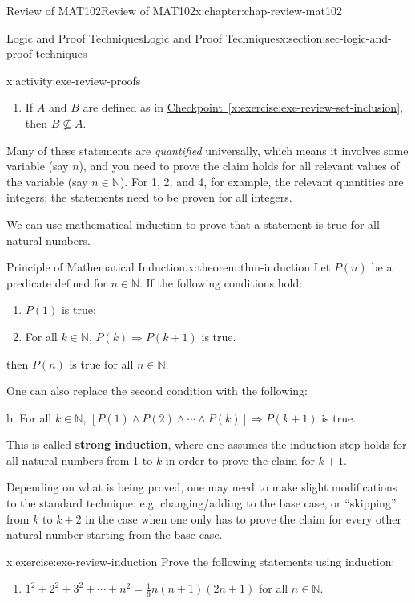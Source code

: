 \documentclass[oneside,10pt,]{book}
\newcommand{\xreffont}{\relax}
\newcommand{\terminology}[1]{\textbf{#1}}
\numberwithin{equation}{section}
\begin{document}
\begin{chapterptx}{Review of MAT102}{}{Review of MAT102}{}{}{x:chapter:chap-review-mat102}
\begin{sectionptx}{Logic and Proof Techniques}{}{Logic and Proof Techniques}{}{}{x:section:sec-logic-and-proof-techniques}
\begin{activity}{}{x:activity:exe-review-proofs}
\begin{enumerate}[label=(\alph*)]
\item{}If \(A\) and \(B\) are defined as in \hyperref[x:exercise:exe-review-set-inclusion]{Checkpoint~{\xreffont\ref{x:exercise:exe-review-set-inclusion}}}, then \(B \not\subseteq A\).%
\end{enumerate}
%
\end{activity}
Many of these statements are \emph{quantified} universally, which means it involves some variable (say \(n\)), and you need to prove the claim holds for all relevant values of the variable (say \(n \in \mathbb{N}\)). For 1, 2, and 4, for example, the relevant quantities are integers; the statements need to be proven for all integers.%
\par
We can use mathematical induction to prove that a statement is true for all natural numbers.%
\begin{theorem}{Principle of Mathematical Induction.}{}{x:theorem:thm-induction}%
Let \(P(n)\) be a predicate defined for \(n \in \mathbb{N}\). If the following conditions hold:%
\begin{enumerate}[label=(\alph*)]
\item{}\(P(1)\) is true;%
\item{}For all \(k \in \mathbb{N}\), \(P(k) \Rightarrow P(k+1)\) is true.%
\end{enumerate}
then \(P(n)\) is true for all \(n \in \mathbb{N}\).%
\par
One can also replace the second condition with the following:%
\par
b.\textasteriskcentered{} For all \(k \in \mathbb{N}\), \([P(1) \wedge P(2) \wedge \cdots \wedge P(k)] \Rightarrow P(k+1)\) is true.%
\par
This is called \terminology{strong induction}, where one assumes the induction step holds for all natural numbers from 1 to \(k\) in order to prove the claim for \(k+1\).%
\end{theorem}
Depending on what is being proved, one may need to make slight modifications to the standard technique: e.g. changing\slash{}adding to the base case, or ``skipping'' from \(k\) to \(k+2\) in the case when one only has to prove the claim for every other natural number starting from the base case.%
\begin{inlineexercise}{}{x:exercise:exe-review-induction}%
Prove the following statements using induction:%
%
\begin{enumerate}[label=(\alph*)]
\item{}\(1^2 + 2^2 + 3^2 + \cdots + n^2 = \frac{1}{6}n(n+1)(2n+1)\) for all \(n \in \mathbb{N}\).%

\end{enumerate}
\end{inlineexercise}
\end{sectionptx}
\end{chapterptx}
\end{document}

